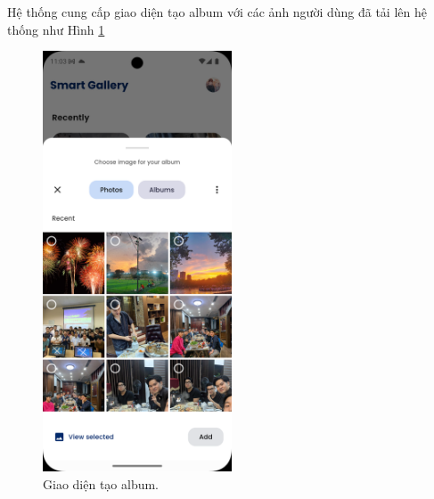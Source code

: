 Hệ thống cung cấp giao diện tạo album với các ảnh người dùng đã tải lên hệ thống như Hình \ref{fig:create-album}

\begin{figure}[H]
    \centering  
    \includegraphics[width=0.5\textwidth]{figures/c4/4-2/create_album.png}
    \caption{Giao diện tạo album.}
    \label{fig:create-album}
\end{figure}
